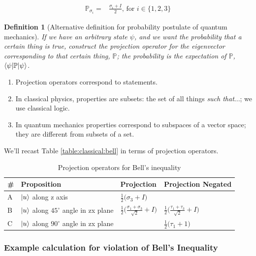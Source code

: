 \documentclass[]{article}
\newtheorem{defn}[thm]{Definition}
\begin{document}
\begin{align*}
	\mathbb{P}_{\sigma_i} =& \frac{\sigma_i + I}{2} \text{, for $i \in \{1,2, 3\}$}
\end{align*}

\begin{defn}[Alternative definition  for probability postulate of quantum mechanics]
	If we have an arbitrary state $\psi$, and we want the probability that a certain thing is true, construct the projection operator for the eigenvector corresponding to that certain thing, $\mathbb{P}$; the probability is the expectation of $\mathbb{P}$, $\braket{\psi|\mathbb{P}|\psi}$.
\end{defn}

\begin{enumerate}
	\item Projection operators correspond to statements.
	\item In classical physics, properties are subsets: the set of all things \emph{such that}...; we use classical logic.
	\item In quantum mechanics properties correspond to subspaces of a vector space; they are different from subsets of a set. 
\end{enumerate}

We'll recast Table \ref{table:classical:bell} in terms of projection operators.
\begin{table}[H]
	\caption{Projection operators for Bell's inequality}\label{table:projection:bell}
	\begin{center}
		\begin{tabular}{|l|l|l|l|}\hline
			\#&Proposition&Projection & Projection Negated\\ \hline 
			A& $\ket{u}$ along z axis&$\frac{1}{2}\big(\sigma_3 + I\big)$&\\ \hline
			B&$ \ket{u}$ along $45^{\circ}$ angle in zx plane&$\frac{1}{2}\big(\frac{\sigma_1+\sigma_3}{\sqrt{2}}+I\big)$&$\frac{1}{2}\big(\frac{\tau_1+\tau_3}{\sqrt{2}}+I\big)$\\ \hline
			C&$ \ket{u}$ along $90^{\circ}$ angle in zx plane&&$\frac{1}{2}\big(\tau_1+1\big)$\\ \hline
		\end{tabular}
	\end{center}
\end{table}

\subsubsection{Example calculation for violation of Bell's Inequality}
\end{document}
